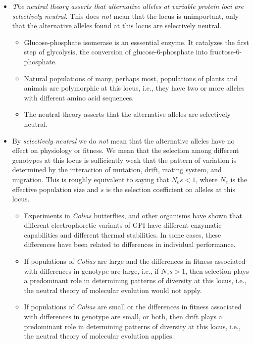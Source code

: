 \begin{itemize}

\item {\it The neutral theory asserts that alternative alleles at
    variable protein loci are selectively neutral.} This does {\it
    not\/} mean that the locus is unimportant, only that the
  alternative alleles found at this locus are selectively
  neutral.

\begin{itemize}

\item Glucose-phosphate isomerase is an esssential enzyme. It
  catalyzes the first step of glycolysis, the conversion of
  glucose-6-phosphate into fructose-6-phosphate. 

\item Natural populations of many, perhaps most, populations of plants
  and animals are polymorphic at this locus, i.e., they have two or
  more alleles with different amino acid sequences.

\item The neutral theory asserts that the alternative alleles are
  selectively neutral.

\end{itemize}

\item By {\it selectively neutral\/} we do {\it not\/} mean that the
  alternative alleles have no effect on physiology or fitness. We mean
  that the selection among different genotypes at this locus is
  sufficiently weak that the pattern of variation is determined by the
  interaction of mutation, drift, mating system, and migration. This
  is roughly equivalent to saying that $N_es < 1$, where $N_e$ is the
  effective population size and $s$ is the selection coefficient on
  alleles at this locus.

\begin{itemize}

\item Experiments in {\it Colias\/} butterflies, and other organisms
  have shown that different electrophoretic variants of GPI have
  different enzymatic capabilities and different thermal
  stabilities. In some cases, these differences have been related to
  differences in individual performance.

\item If populations of {\it Colias\/} are large and the differences
  in fitness associated with differences in genotype are large, i.e.,
  if $N_es > 1$, then selection plays a predominant role in
  determining patterns of diversity at this locus, i.e., the neutral
  theory of molecular evolution would not apply.

\item If populations of {\it Colias\/} are small or the differences in
  fitness associated with differences in genotype are small, or both,
  then drift plays a predominant role in determining patterns of
  diversity at this locus, i.e., the neutral theory of molecular
  evolution applies.

\end{itemize}

\end{itemize}

